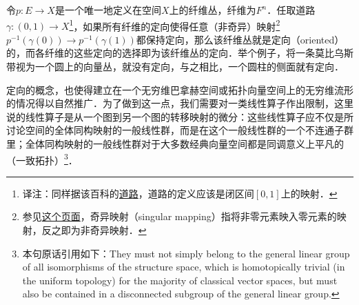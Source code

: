 



令$p: E\to X$是一个唯一地定义在空间$X$上的纤维丛，纤维为$F^n$．任取道路$\gamma: (0, 1)\to X$\footnote{译注：同样据该百科的\href{https://encyclopediaofmath.org/wiki/Path}{道路}，道路的定义应该是闭区间$[0, 1]$上的映射．}，如果所有纤维的定向使得任意（非奇异）映射\footnote{参见\href{https://solitaryroad.com/c218.html}{这个页面}，奇异映射（singular mapping）指将非零元素映入零元素的映射，反之即为非奇异映射．}$p^{-1}(\gamma(0))\to p^{-1}(\gamma(1))$都保持定向，那么该纤维丛就是定向（oriented）的，而各纤维的这些定向的选择即为该纤维丛的定向．举个例子，将一条莫比乌斯带视为一个圆上的向量丛，就没有定向，与之相比，一个圆柱的侧面就有定向．





定向的概念，也使得建立在一个无穷维巴拿赫空间或拓扑向量空间上的无穷维流形的情况得以自然推广．为了做到这一点，我们需要对一类线性算子作出限制，这里说的线性算子是从一个图到另一个图的转移映射的微分：这些线性算子应不仅是所讨论空间的全体同构映射的一般线性群，而是在这个一般线性群的一个不连通子群里；全体同构映射的一般线性群对于大多数经典向量空间都是同调意义上平凡的（一致拓扑）\footnote{本句原话引用如下：They must not simply belong to the general linear group of all isomorphisms of the structure space, which is homotopically trivial (in the uniform topology) for the majority of classical vector spaces, but must also be contained in a disconnected subgroup of the general linear group. }．


